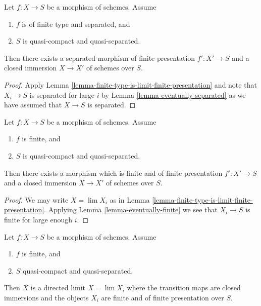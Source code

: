 \begin{proposition}
\label{proposition-separated-closed-in-finite-presentation}
Let $f : X \to S$ be a morphism of schemes. Assume
\begin{enumerate}
\item $f$ is of finite type and separated, and
\item $S$ is quasi-compact and quasi-separated.
\end{enumerate}
Then there exists a separated morphism of finite presentation
$f' : X' \to S$ and a closed immersion $X \to X'$ of schemes over $S$.
\end{proposition}

\begin{proof}
Apply Lemma \ref{lemma-finite-type-is-limit-finite-presentation}
and note that $X_i \to S$ is separated for
large $i$ by Lemma \ref{lemma-eventually-separated} as we have
assumed that $X \to S$ is separated.
\end{proof}

\begin{lemma}
\label{lemma-finite-closed-in-finite-finite-presentation}
Let $f : X \to S$ be a morphism of schemes. Assume
\begin{enumerate}
\item $f$ is finite, and
\item $S$ is quasi-compact and quasi-separated.
\end{enumerate}
Then there exists a morphism which is finite and of finite presentation
$f' : X' \to S$ and a closed immersion $X \to X'$ of schemes over $S$.
\end{lemma}

\begin{proof}
We may write $X = \lim X_i$ as in
Lemma \ref{lemma-finite-type-is-limit-finite-presentation}.
Applying Lemma \ref{lemma-eventually-finite} we see that $X_i \to S$
is finite for large enough $i$.
\end{proof}

\begin{lemma}
\label{lemma-finite-in-finite-and-finite-presentation}
Let $f : X \to S$ be a morphism of schemes. Assume
\begin{enumerate}
\item $f$ is finite, and
\item $S$ quasi-compact and quasi-separated.
\end{enumerate}
Then $X$ is a directed limit $X = \lim X_i$
where the transition maps are closed immersions and the objects
$X_i$ are finite and of finite presentation over $S$.
\end{lemma}

